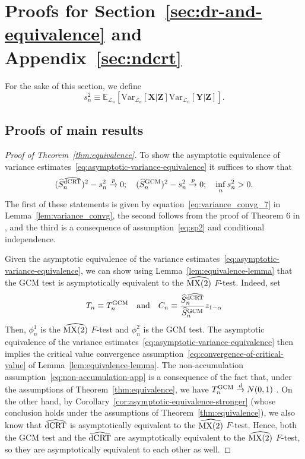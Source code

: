 \documentclass[aos]{imsart}
\theoremstyle{plain}
\theoremstyle{remark}
\newcommand{\E}{\mathbb E}								%
\newcommand{\V}{\mathrm{Var}}							%
\newcommand{\convp}{\overset p \rightarrow}             %
\newcommand{\convd}{\overset d \rightarrow}             %
\newcommand{\prx}{\bm X}								%
\newcommand{\prz}{\bm Z}								%
\newcommand{\pry}{{\bm Y}}								%
\newcommand{\law}{\mathcal L}							%
\newcommand{\GCM}{\textnormal{GCM}}						%
\newcommand{\dCRThat}{\widehat{\textnormal{dCRT}}}		%
\newcommand{\MXtwohat}{\widehat{\textnormal{MX(2)}}}		%
\begin{document}
\section{Proofs for Section~\ref{sec:dr-and-equivalence} and Appendix~\ref{sec:ndcrt}}

For the sake of this section, we define
\begin{equation}
	s^2_n \equiv \E_{\law_n}[\V_{\law_n}[\prx|\prz]\V_{\law_n}[\pry|\prz]]. 
\end{equation}

\subsection{Proofs of main results}

\begin{proof}[Proof of Theorem~\ref{thm:equivalence}]

To show the asymptotic equivalence of variance estimates~\eqref{eq:asymptotic-variance-equivalence} it suffices to show that
\begin{equation}
(\widehat S_n^{\dCRThat})^2 - s^2_n \convp 0; \quad (\widehat S_n^{\GCM})^2 - s^2_n \convp 0; \quad \inf_{n} s^2_n > 0.
\end{equation}
The first of these statements is given by equation~\eqref{eq:variance_convg_7} in Lemma~\ref{lem:variance_convg}, the second follows from the proof of Theorem 6 in \citet{Shah2018}, and the third is a consequence of assumption~\eqref{eq:sp2} and conditional independence.
  
Given the asymptotic equivalence of the variance estimates~\eqref{eq:asymptotic-variance-equivalence}, we can show using Lemma~\ref{lem:equivalence-lemma} that the GCM test is asymptotically equivalent to the $\MXtwohat$ $F$-test. Indeed, set
\begin{equation}
	T_n \equiv T_n^\GCM \quad \text{and} \quad C_n \equiv \frac{\widehat S_n^{\dCRThat}}{\widehat S_{n}^{\GCM}}z_{1-\alpha}
\end{equation}
Then, $\phi_n^1$ is the $\MXtwohat$ $F$-test and $\phi_n^2$ is the GCM test. The asymptotic equivalence of the variance estimates~\eqref{eq:asymptotic-variance-equivalence} then implies the critical value convergence assumption~\eqref{eq:convergence-of-critical-value} of Lemma~\ref{lem:equivalence-lemma}. The non-accumulation assumption~\eqref{eq:non-accumulation-app} is a consequence of the fact that, under the assumptions of Theorem~\ref{thm:equivalence}, we have $T^{\text{\GCM}}_n \convd N(0,1)$ \citep{Shah2018}. On the other hand, by Corollary~\ref{cor:asymptotic-equivalence-stronger} (whose conclusion holds under the assumptions of Theorem~\ref{thm:equivalence}), we also know that $\dCRThat$ is asymptotically equivalent to the $\MXtwohat$ $F$-test. Hence, both the GCM test and the $\dCRThat$ are asymptotically equivalent to the $\MXtwohat$ $F$-test, so they are asymptotically equivalent to each other as well.
\end{proof}
\end{document}
